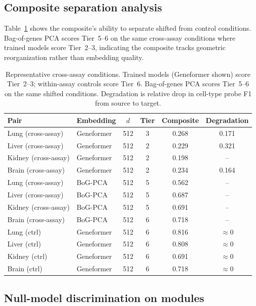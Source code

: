 \documentclass[11pt]{article}
\begin{document}
\subsection{Composite separation analysis}

Table~\ref{tab:separation} shows the composite's ability to separate shifted from control conditions. Bag-of-genes PCA scores Tier~5--6 on the same cross-assay conditions where trained models score Tier~2--3, indicating the composite tracks geometric reorganization rather than embedding quality.

\begin{table}[h!]
\centering
\caption{Representative cross-assay conditions. Trained models (Geneformer shown) score Tier~2--3; within-assay controls score Tier~6. Bag-of-genes PCA scores Tier~5--6 on the same shifted conditions. Degradation is relative drop in cell-type probe F1 from source to target.}
\label{tab:separation}
\small
\begin{tabular}{@{}llcccc@{}}
\toprule
Pair & Embedding & $d$ & Tier & Composite & Degradation \\
\midrule
Lung (cross-assay) & Geneformer & 512 & 3 & 0.268 & 0.171 \\
Liver (cross-assay) & Geneformer & 512 & 2 & 0.229 & 0.321 \\
Kidney (cross-assay) & Geneformer & 512 & 2 & 0.198 & -- \\
Brain (cross-assay) & Geneformer & 512 & 2 & 0.234 & 0.164 \\
\midrule
Lung (cross-assay) & BoG-PCA & 512 & 5 & 0.562 & -- \\
Liver (cross-assay) & BoG-PCA & 512 & 5 & 0.687 & -- \\
Kidney (cross-assay) & BoG-PCA & 512 & 5 & 0.691 & -- \\
Brain (cross-assay) & BoG-PCA & 512 & 6 & 0.718 & -- \\
\midrule
Lung (ctrl) & Geneformer & 512 & 6 & 0.816 & $\approx 0$ \\
Liver (ctrl) & Geneformer & 512 & 6 & 0.808 & $\approx 0$ \\
Kidney (ctrl) & Geneformer & 512 & 6 & 0.691 & $\approx 0$ \\
Brain (ctrl) & Geneformer & 512 & 6 & 0.718 & $\approx 0$ \\
\bottomrule
\end{tabular}
\end{table}

\subsection{Null-model discrimination on modules}
\end{document}
